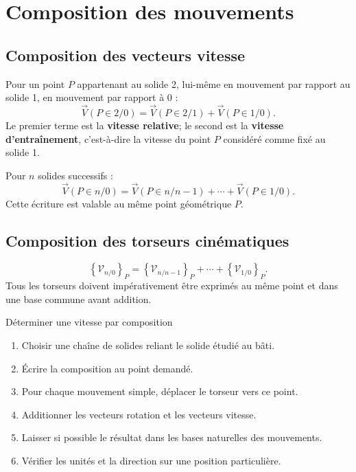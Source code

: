 
\section{Composition des mouvements}
\label{sec:cine-composition}

\subsection{Composition des vecteurs vitesse}

Pour un point $P$ appartenant au solide 2, lui-même en mouvement par
rapport au solide 1, en mouvement par rapport à 0 :
\[
\boxed{
\vec V(P\in2/0)
=\vec V(P\in2/1)+\vec V(P\in1/0).}
\]
Le premier terme est la \textbf{vitesse relative}; le second est la
\textbf{vitesse d'entraînement}, c'est-à-dire la vitesse du point $P$
considéré comme fixé au solide 1.

Pour $n$ solides successifs :
\[
\vec V(P\in n/0)
=\vec V(P\in n/n-1)+\cdots+\vec V(P\in1/0).
\]
Cette écriture est valable au même point géométrique $P$.

\subsection{Composition des torseurs cinématiques}

\[
\boxed{
\left\{\mathcal V_{n/0}\right\}_P
=\left\{\mathcal V_{n/n-1}\right\}_P+
\cdots+
\left\{\mathcal V_{1/0}\right\}_P.}
\]
Tous les torseurs doivent impérativement être exprimés au même point et
dans une base commune avant addition.

\begin{TLCineMethod}{Déterminer une vitesse par composition}
\begin{enumerate}
  \item Choisir une chaîne de solides reliant le solide étudié au bâti.
  \item Écrire la composition au point demandé.
  \item Pour chaque mouvement simple, déplacer le torseur vers ce point.
  \item Additionner les vecteurs rotation et les vecteurs vitesse.
  \item Laisser si possible le résultat dans les bases naturelles des mouvements.
  \item Vérifier les unités et la direction sur une position particulière.
\end{enumerate}
\end{TLCineMethod}

